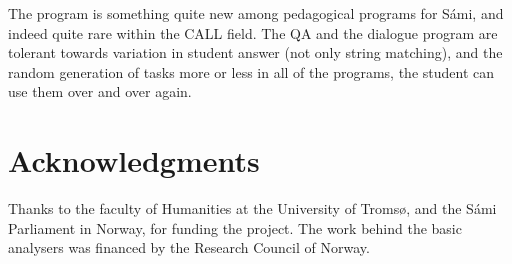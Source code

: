 \documentclass[11pt]{article}
\begin{document}
The program is something quite new among pedagogical programs for Sámi, and indeed quite rare within the CALL field. %
The QA and the dialogue program are tolerant towards variation in student answer (not only string matching), and the random generation of tasks more or less in all of the programs, the student can use them over and over again. 

\section*{Acknowledgments}
Thanks to the faculty of Humanities at the University of Tromsø, and the Sámi Parliament in Norway, for funding the project. The work behind the basic analysers was financed by the Research Council of Norway. 
\end{document}
